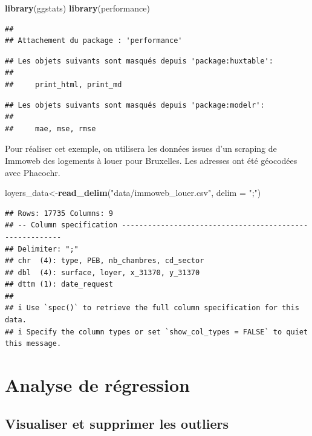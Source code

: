 \documentclass[
]{book}
\newenvironment{Shaded}{\begin{snugshade}}{\end{snugshade}}
\newcommand{\AttributeTok}[1]{\textcolor[rgb]{0.13,0.29,0.53}{#1}}
\newcommand{\FunctionTok}[1]{\textcolor[rgb]{0.13,0.29,0.53}{\textbf{#1}}}
\newcommand{\NormalTok}[1]{#1}
\newcommand{\OtherTok}[1]{\textcolor[rgb]{0.56,0.35,0.01}{#1}}
\newcommand{\StringTok}[1]{\textcolor[rgb]{0.31,0.60,0.02}{#1}}
\begin{document}
\begin{Shaded}
\begin{Highlighting}[]
\FunctionTok{library}\NormalTok{(ggstats)}
\FunctionTok{library}\NormalTok{(performance)}
\end{Highlighting}
\end{Shaded}

\begin{verbatim}
## 
## Attachement du package : 'performance'
\end{verbatim}

\begin{verbatim}
## Les objets suivants sont masqués depuis 'package:huxtable':
## 
##     print_html, print_md
\end{verbatim}

\begin{verbatim}
## Les objets suivants sont masqués depuis 'package:modelr':
## 
##     mae, mse, rmse
\end{verbatim}

Pour réaliser cet exemple, on utilisera les données issues d'un scraping
de Immoweb des logements à louer pour Bruxelles. Les adresses ont été
géocodées avec Phacochr.

\begin{Shaded}
\begin{Highlighting}[]
\NormalTok{loyers\_data}\OtherTok{\textless{}{-}}\FunctionTok{read\_delim}\NormalTok{(}\StringTok{"data/immoweb\_louer.csv"}\NormalTok{, }\AttributeTok{delim =} \StringTok{";"}\NormalTok{)}
\end{Highlighting}
\end{Shaded}

\begin{verbatim}
## Rows: 17735 Columns: 9
## -- Column specification --------------------------------------------------------
## Delimiter: ";"
## chr  (4): type, PEB, nb_chambres, cd_sector
## dbl  (4): surface, loyer, x_31370, y_31370
## dttm (1): date_request
## 
## i Use `spec()` to retrieve the full column specification for this data.
## i Specify the column types or set `show_col_types = FALSE` to quiet this message.
\end{verbatim}

\hypertarget{analyse-de-ruxe9gression}{%
\section{Analyse de régression}\label{analyse-de-ruxe9gression}}

\hypertarget{visualiser-et-supprimer-les-outliers}{%
\subsection{Visualiser et supprimer les outliers}\label{visualiser-et-supprimer-les-outliers}}
\end{document}
